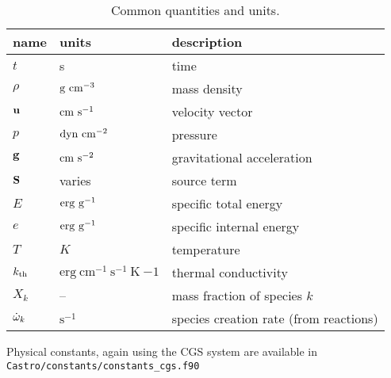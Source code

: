 \begin{table}[t]
\renewcommand{\arraystretch}{1.2}
\centering
\begin{tabular}{lll}
name & units & description \\
\hline
$t$    & s       & time \\
$\rho$ & $\mathrm{g~cm^{-3}}$  & mass density \\
${\bf u}$  & $\mathrm{cm~s^{-1}}$  & velocity vector \\
$p$    & $\mathrm{dyn~cm^{-2}}$ & pressure \\
${\bf g}$  & $\mathrm{cm~s^{-2}}$ & gravitational acceleration \\
${\bf S}$  & varies       & source term \\
$E$    & $\mathrm{erg~g^{-1}}$      & specific total energy \\
$e$    & $\mathrm{erg~g^{-1}}$      & specific internal energy \\
$T$    & $K$          & temperature \\
${k_\mathrm{th}}$ & $\mathrm{erg~cm^{-1}~s^{-1}~K~{-1}}$ & thermal conductivity \\
$X_k$  & --           & mass fraction of species $k$ \\
$\dot\omega_k$ & $\mathrm{s^{-1}}$  & species creation rate (from reactions) \\
\hline
\end{tabular}
\caption{\label{table:units} Common quantities and units.}
\renewcommand{\arraystretch}{1.0}
\end{table}

Physical constants, again using the CGS system are available 
in {\tt Castro/constants/constants\_cgs.f90}

